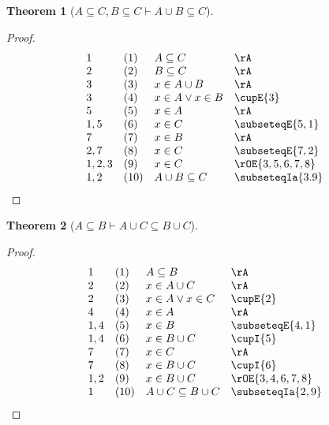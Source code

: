 \documentclass{book}
\theoremstyle{plain}
\newtheorem{theorem}{Theorem}
\theoremstyle{remark}
\theoremstyle{definition}
\begin{document}
\label{ASubseteqCwBSubseteqCImpAcuBSubseteqC}
\begin{theorem}[\(A \subseteq C, B \subseteq C \vdash A \cup B \subseteq C\)]
\end{theorem}
\begin{proof}
	\[
	\begin{array}{llll}
		1 & (1) & A \subseteq C & \rA \\
		2 & (2) & B \subseteq C & \rA \\
		3 & (3) & x \in A \cup B & \rA \\
		3 & (4) & x \in A \lor x \in B & \cupE{3} \\
		5 & (5) & x \in A & \rA \\
		1,5 & (6) & x \in C & \subseteqE{5,1}\\		
		7 & (7) & x \in B & \rA\\		
		2,7 & (8) & x \in C & \subseteqE{7,2}\\	
		1,2,3 & (9) & x \in C & \rOE{3,5,6,7,8}\\	
		1,2 & (10) & A\cup B\subseteq C & \subseteqIa{3.9}\\		
	\end{array}
	\]
\end{proof}

\label{ASubseteqBImpAcuCSubseteqBcuC}
\begin{theorem}[\(A \subseteq B \vdash A \cup C \subseteq B \cup C\)]
\end{theorem}
\begin{proof}
	\[
	\begin{array}{llll}
		1 & (1) & A \subseteq B & \rA \\
		2 & (2) & x \in A \cup C & \rA \\
		2 & (3) & x \in A \lor x \in C & \cupE{2}\\
		4 & (4) & x \in A & \rA \\
		1,4 & (5) & x\in B & \subseteqE{4,1}\\
		1,4 & (6) & x\in B\cup C & \cupI{5}\\		
		7 & (7) & x \in C & \rA \\
		7 & (8) & x \in B\cup C & \cupI{6}\\
		1,2 & (9) & x \in B\cup C & \rOE{3,4,6,7,8}\\
		1 & (10) & A\cup C\subseteq B\cup C & \subseteqIa{2,9}\\		
	\end{array}
	\]
\end{proof}
\end{document}
